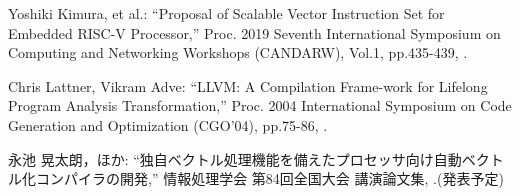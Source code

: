 ﻿\documentclass[a4j]{jarticle}
\begin{document}
\begin{thebibliography}{9}
\vspace{-1mm}
\itemsep -1.7pt
{\footnotesize

{\small Yoshiki Kimura, et al.:      %
\newblock ``Proposal of Scalable Vector Instruction Set for Embedded RISC-V Processor,''
\newblock Proc. 2019 Seventh International Symposium on Computing and Networking Workshops (CANDARW),
\newblock Vol.1,
\newblock pp.435-439,
.}

{\small Chris Lattner, Vikram Adve:      %
\newblock ``LLVM: A Compilation Frame-work for Lifelong Program Analysis Transformation,''
\newblock Proc. 2004 International Symposium on Code Generation and Optimization (CGO’04),
\newblock pp.75-86,
.}

{\small 永池 晃太朗，ほか:      %
\newblock ``独自ベクトル処理機能を備えたプロセッサ向け自動ベクトル化コンパイラの開発,''
\newblock 情報処理学会 第84回全国大会 講演論文集,
.(発表予定)}

}

\end{thebibliography}
\end{document}
